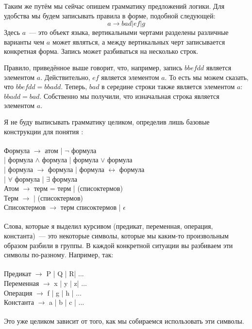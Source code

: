 Таким же путём мы сейчас опишем грамматику предложений логики. Для удобства мы будем записывать правила в форме, подобной следующей:
$$a \to bad | ef | g$$
Здесь $a$~— это объект языка, вертикальными чертами разделены различные варианты чем $a$ может являться, а между вертикальных черт записывается конкретная форма. Запись может разбиваться на несколько строк.

\begin{example}
Правило, приведённое выше говорит, что, например, запись  $bbefdd$ является элементом $a$. Действительно, $ef$ является элементом $a$. То есть мы можем сказать, что $bbefdd = bbadd$. Теперь, $bad$ в середине строки также является элементом $a$: $bbadd = bad$. Собственно мы получили, что изначальная строка является элементом $a$.
\end{example}

Я не буду выписывать грамматику целиком, определив лишь базовые конструкции для понятия :\\
\\
Формула $\to$ атом | $\neg$ формула\\
\hspace*{2cm}| формула $\land$ формула | формула $\lor$ формула\\
\hspace*{2cm}| формула $\to$ формула | формула $\leftrightarrow$ формула\\
\hspace*{2cm}| $\forall$  формула | $\exists$  формула\\
Атом $\to$ терм = терм |  (списоктермов)\\
Терм $\to$  |  (списоктермов)\\
Списоктермов $\to$ терм списоктермов | $\epsilon$\\
\\
Слова, которые я выделил курсивом (предикат, переменная, операция, константа)~— это некоторые символы, которые мы каким-то произвольным образом разбили в группы. В каждой конкретной ситуации вы разбиваем эти символы по-разному. Например, так:\\
\\
Предикат $\to$ P | Q | R| $\ldots$\\
Переменная $\to$ x | y | z| $\ldots$\\
Операция $\to$ f | g | h | $\ldots$\\
Константа $\to$ a | b | c | $\ldots$\\
\\
Это уже целиком зависит от того, как мы собираемся использовать эти символы.

